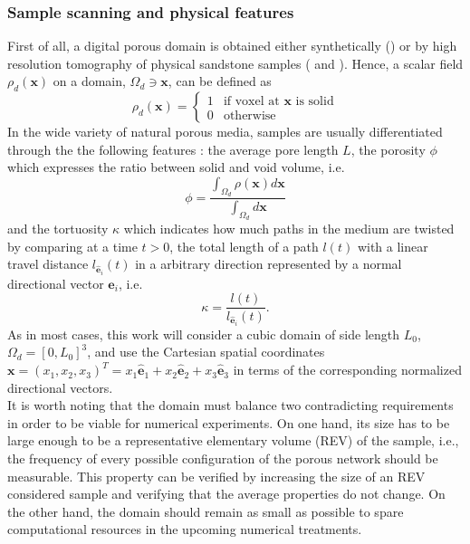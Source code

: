 \subsubsection{Sample scanning and physical features}
First of all, a digital porous domain is obtained either synthetically (\cite{Dentz2017}) or by high resolution tomography of physical sandstone samples (\cite{Meyer2016} and \cite{Puyguiraud2019}).
Hence, a scalar field  $\rho_d(\textbf{x})$ on a domain, $\Omega_d\ni\textbf{x}$, can be defined as 
\[
\rho_d(\textbf{x})=\left\{
\begin{array}{ll}
1 &  \textrm{if voxel at $\textbf{x}$ is solid} \\
0 & \textrm{otherwise}
\end{array} 
\right.
\]
In the wide variety of natural porous media, samples are usually differentiated through the the following features : the average pore length $L$, the porosity $\phi$ which expresses the ratio between solid and void volume, i.e.
\[
\phi = \frac{\int_{\Omega_d}\rho(\textbf{x})d\textbf{x}}{\int_{\Omega_d}d\textbf{x}}
\] 
and the tortuosity $\kappa$ which indicates how much paths in the medium are twisted by comparing at a time $t>0$, the total length of a path $l(t)$ with a linear travel distance $l_{\hat{\textbf{e}}_i}(t)$ in a arbitrary direction represented by a normal directional vector $\hat{\textbf{e}}_i$, i.e. 
\[
\kappa = \frac{l(t)}{l_{\hat{\textbf{e}}_i}(t)}.
\] 
As in most cases, this work will consider a cubic domain of side length $L_0$, $\Omega_d=[0,L_0]^3$, and use the Cartesian spatial coordinates $\textbf{x}=(x_1,x_2,x_3)^T=x_1\hat{\textbf{e}}_1+x_2\hat{\textbf{e}}_2+x_3\hat{\textbf{e}}_3$ in terms of the corresponding normalized directional vectors.\\
It is worth noting that the domain must balance two contradicting requirements in order to be viable for numerical experiments. 
On one hand, its size has to be large enough to be a representative elementary volume (REV) of the sample, i.e., the frequency of every possible configuration of the porous network should be measurable.
This property can be verified by increasing the size of an REV considered sample and verifying that the average properties do not change.
On the other hand, the domain should remain as small as possible to spare computational resources in the upcoming numerical treatments.\\

